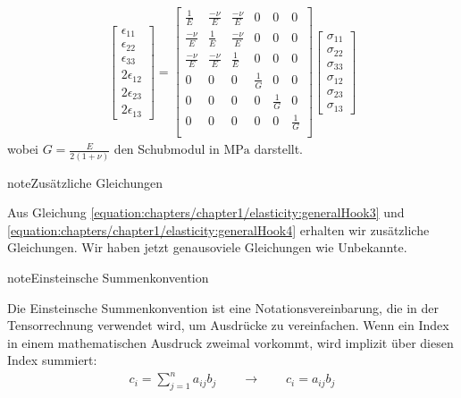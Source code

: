 \documentclass[letterpaper,10pt,german]{jupyterBook}
\begin{document}
\begin{equation}\label{equation:chapters/chapter1/elasticity:generalHook4}
\begin{split}\begin{bmatrix} 
\epsilon_{11} \\
\epsilon_{22} \\
\epsilon_{33} \\
2\epsilon_{12} \\
2\epsilon_{23} \\
2\epsilon_{13} 
\end{bmatrix} =\begin{bmatrix}
\frac{1}{E} & \frac{-\nu}{E} & \frac{-\nu}{E} & 0 & 0 & 0 \\
\frac{-\nu}{E} & \frac{1}{E} & \frac{-\nu}{E} & 0 & 0 & 0 \\
\frac{-\nu}{E} & \frac{-\nu}{E} & \frac{1}{E} & 0 & 0 & 0 \\
0 & 0 & 0 & \frac{1}{G} & 0 & 0 \\
0 & 0 & 0 & 0 & \frac{1}{G} & 0 \\
0 & 0 & 0 & 0 & 0 & \frac{1}{G} \\ 
\end{bmatrix} \begin{bmatrix} \sigma_{11} \\ \sigma_{22} \\ \sigma_{33} \\ \sigma_{12} \\ \sigma_{23} \\ \sigma_{13} \end{bmatrix}\end{split}
\end{equation}
\sphinxAtStartPar
wobei \(G=\frac{E}{2(1+\nu)}\) den Schubmodul in \(\text{MPa}\) darstellt.

\begin{sphinxadmonition}{note}{Zusätzliche Gleichungen}

\sphinxAtStartPar
Aus Gleichung \eqref{equation:chapters/chapter1/elasticity:generalHook3} und \eqref{equation:chapters/chapter1/elasticity:generalHook4} erhalten wir  zusätzliche Gleichungen. Wir haben jetzt genausoviele Gleichungen wie Unbekannte.
\end{sphinxadmonition}

\begin{sphinxadmonition}{note}{Einsteinsche Summenkonvention}

\sphinxAtStartPar
Die Einsteinsche Summenkonvention ist eine Notationsvereinbarung, die in der Tensorrechnung verwendet wird, um Ausdrücke zu vereinfachen. Wenn ein Index in einem mathematischen Ausdruck zweimal vorkommt, wird implizit über diesen Index summiert:
\begin{equation*}
\begin{split}
c_i = \sum_{j=1}^{n} a_{ij} b_j \qquad \rightarrow \qquad  c_i=a_{ij} b_j
\end{split}
\end{equation*}\end{sphinxadmonition}
\end{document}
